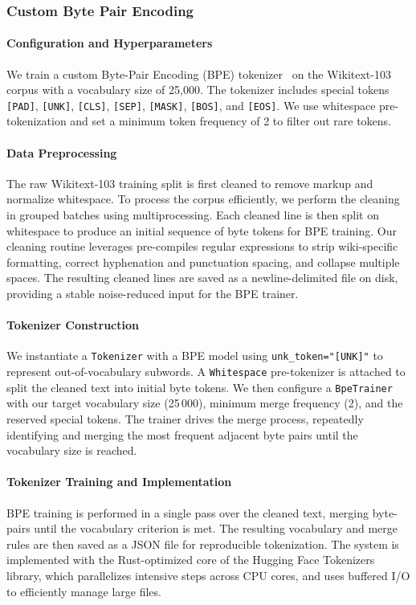 \subsubsection{Custom Byte Pair Encoding}
\paragraph{Configuration and Hyperparameters}
We train a custom Byte-Pair Encoding (BPE) tokenizer~\cite{sennrich2016neural} on the Wikitext-103 corpus with a vocabulary size of 25,000. The tokenizer includes special tokens \texttt{[PAD]}, \texttt{[UNK]}, \texttt{[CLS]}, \texttt{[SEP]}, \texttt{[MASK]}, \texttt{[BOS]}, and \texttt{[EOS]}. We use whitespace pre-tokenization and set a minimum token frequency of 2 to filter out rare tokens.
\paragraph{Data Preprocessing}
The raw Wikitext-103 training split is first cleaned to remove markup and normalize whitespace. To process the corpus efficiently, we perform the cleaning in grouped batches using multiprocessing. Each cleaned line is then split on whitespace to produce an initial sequence of byte tokens for BPE training. Our cleaning routine leverages pre-compiles regular expressions to strip wiki-specific formatting, correct hyphenation and punctuation spacing, and collapse multiple spaces. The resulting cleaned lines are saved as a newline-delimited file on disk, providing a stable noise-reduced input for the BPE trainer.
\paragraph{Tokenizer Construction}
We instantiate a \texttt{Token\allowbreak izer} with a BPE model using \texttt{unk\_token="[UNK]"} to represent out-of-vocabulary subwords. A \texttt{Whitespace} pre-tokenizer is attached to split the cleaned text into initial byte tokens. We then configure a \texttt{BpeTrainer} with our target vocabulary size (25\,000), minimum merge frequency (2), and the reserved special tokens. The trainer drives the merge process, repeatedly identifying and merging the most frequent adjacent byte pairs until the vocabulary size is reached.
\paragraph{Tokenizer Training and Implementation}
BPE training is performed in a single pass over the cleaned text, merging byte-pairs until the vocabulary criterion is met. The resulting vocabulary and merge rules are then saved as a JSON file for reproducible tokenization. The system is implemented with the Rust-optimized core of the Hugging Face Tokenizers library, which parallelizes intensive steps across CPU cores, and uses buffered I/O to efficiently manage large files.
